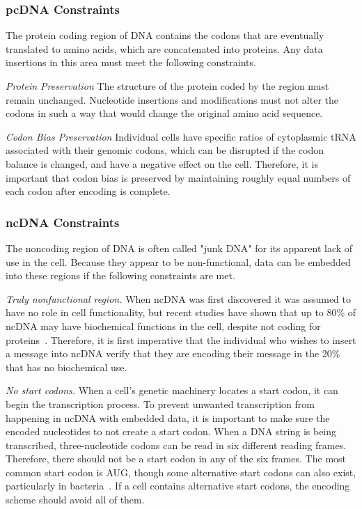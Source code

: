 \documentclass{bioinfo}
\begin{document}
\subsubsection{pcDNA Constraints}

The protein coding region of DNA contains the codons that are eventually translated to amino acids, which are concatenated into proteins. Any data insertions in this area must meet the following constraints.

\textit{Protein Preservation} The structure of the protein coded by the region must remain unchanged. Nucleotide insertions and modifications must not alter the codons in such a way that would change the original amino acid sequence.

\textit{Codon Bias Preservation} Individual cells have specific ratios of cytoplasmic tRNA associated with their genomic codons, which can be disrupted if the codon balance is changed, and have a negative effect on the cell. Therefore, it is important that codon bias is preserved by maintaining roughly equal numbers of each codon after encoding is complete.

\subsubsection{ncDNA Constraints}

The noncoding region of DNA is often called "junk DNA" for its apparent lack of use in the cell. Because they appear to be non-functional, data can be embedded into these regions if the following constraints are met.

\textit{Truly nonfunctional region.} When ncDNA was first discovered it was assumed to have no role in cell functionality, but recent studies have shown that up to 80\% of ncDNA may have biochemical functions in the cell, despite not coding for proteins~\cite{EPC2012N}. Therefore, it is first imperative that the individual who wishes to insert a message into ncDNA verify that they are encoding their message in the 20\% that has no biochemical use.

\textit{No start codons.} When a cell's genetic machinery locates a start codon, it can begin the transcription process. To prevent unwanted transcription from happening in ncDNA with embedded data, it is important to make sure the encoded nucleotides to not create a start codon. When a DNA string is being transcribed, three-nucleotide codons can be read in six different reading frames. Therefore, there should not be a start codon in any of the six frames. The most common start codon is AUG, though some alternative start codons can also exist, particularly in bacteria~\cite{B1997S}. If a cell contains alternative start codons, the encoding scheme should avoid all of them.
\end{document}
